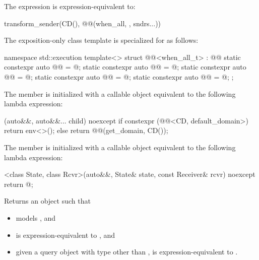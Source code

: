 \pnum
The expression  is expression-equivalent to:
\begin{codeblock}
transform_sender(CD(), @@(when_all, {}, sndrs...))
\end{codeblock}

\pnum
The exposition-only class template 
is specialized for  as follows:
\begin{codeblock}
namespace std::execution {
  template<>
  struct @@<when_all_t> : @@ {
    static constexpr auto @@ = @\seebelow@;
    static constexpr auto @@ = @\seebelow@;
    static constexpr auto @@ = @\seebelow@;
    static constexpr auto @@ = @\seebelow@;
    static constexpr auto @@ = @\seebelow@;
  };
}
\end{codeblock}

\pnum
The member 
is initialized with a callable object
equivalent to the following lambda expression:
\begin{codeblock}
[](auto&&, auto&&... child) noexcept {
  if constexpr (@@<CD, default_domain>) {
    return env<>();
  } else {
    return @@(get_domain, CD());
  }
}
\end{codeblock}

\pnum
The member 
is initialized with a callable object
equivalent to the following lambda expression:
\begin{codeblock}
[]<class State, class Rcvr>(auto&&, State& state, const Receiver& rcvr) noexcept {
  return @\seebelow@;
}
\end{codeblock}
Returns an object  such that
\begin{itemize}
\item
{} models , and
\item
{} is expression-equivalent to
, and
\item
given a query object  with type other than \cv{} ,
 is expression-equivalent to .
\end{itemize}

